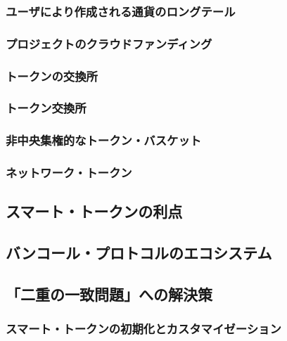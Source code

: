 \documentclass{jsarticle}
\begin{document}
\subsubsection{ユーザにより作成される通貨のロングテール}



\subsubsection{プロジェクトのクラウドファンディング}



\subsubsection{トークンの交換所}



\subsubsection{トークン交換所}



\subsubsection{非中央集権的なトークン・バスケット}



\subsubsection{ネットワーク・トークン}



\subsection{スマート・トークンの利点}



\subsection{バンコール・プロトコルのエコシステム}



\subsection{「二重の一致問題」への解決策}



\subsubsection{スマート・トークンの初期化とカスタマイゼーション}
\end{document}
